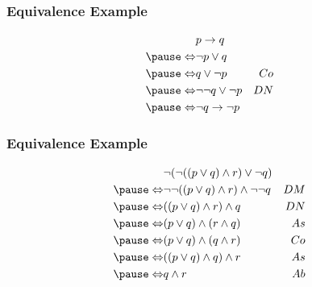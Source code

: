 \documentclass[dvipsnames]{beamer}
\begin{document}
\begin{frame}
  \frametitle{Equivalence Example}

  \begin{example}
    \begin{eqnarray*}
                      & p \rightarrow q           &   \\
      \pause
      \Leftrightarrow & \neg p \vee q             &   \\
      \pause
      \Leftrightarrow & q \vee \neg p             & Co\\
      \pause
      \Leftrightarrow & \neg \neg q \vee \neg p   & DN\\
      \pause
      \Leftrightarrow & \neg q \rightarrow \neg p &
    \end{eqnarray*}
  \end{example}
\end{frame}

\begin{frame}
  \frametitle{Equivalence Example}

  \begin{example}
    \begin{eqnarray*}
                      & \neg (\neg ((p \vee q) \wedge r) \vee \neg q)      &   \\
      \pause
      \Leftrightarrow & \neg \neg ((p \vee q) \wedge r) \wedge \neg \neg q & DM\\
      \pause
      \Leftrightarrow & ((p \vee q) \wedge r) \wedge q                     & DN\\
      \pause
      \Leftrightarrow & (p \vee q) \wedge (r \wedge q)                     & As\\
      \pause
      \Leftrightarrow & (p \vee q) \wedge (q \wedge r)                     & Co\\
      \pause
      \Leftrightarrow & ((p \vee q) \wedge q) \wedge r                     & As\\
      \pause
      \Leftrightarrow & q \wedge r                                         & Ab
    \end{eqnarray*}
  \end{example}
\end{frame}
\end{document}
